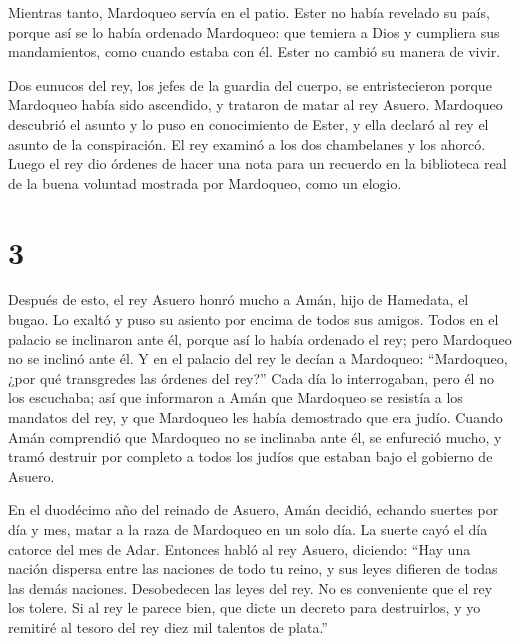  Mientras tanto, Mardoqueo servía en el patio.
 Ester no había revelado su país, porque así se lo había
ordenado Mardoqueo: que temiera a Dios y cumpliera sus mandamientos,
como cuando estaba con él. Ester no cambió su manera de vivir.

 Dos eunucos del rey, los jefes de la guardia del cuerpo,
se entristecieron porque Mardoqueo había sido ascendido, y trataron de
matar al rey Asuero.  Mardoqueo descubrió el asunto y lo
puso en conocimiento de Ester, y ella declaró al rey el asunto de la
conspiración.  El rey examinó a los dos chambelanes y los
ahorcó. Luego el rey dio órdenes de hacer una nota para un recuerdo en
la biblioteca real de la buena voluntad mostrada por Mardoqueo, como un
elogio.

\hypertarget{section-2}{%
\section{3}\label{section-2}}

 Después de esto, el rey Asuero honró mucho a Amán, hijo
de Hamedata, el bugao. Lo exaltó y puso su asiento por encima de todos
sus amigos.  Todos en el palacio se inclinaron ante él,
porque así lo había ordenado el rey; pero Mardoqueo no se inclinó ante
él.  Y en el palacio del rey le decían a Mardoqueo:
``Mardoqueo, ¿por qué transgredes las órdenes del rey?'' 
Cada día lo interrogaban, pero él no los escuchaba; así que informaron a
Amán que Mardoqueo se resistía a los mandatos del rey, y que Mardoqueo
les había demostrado que era judío.  Cuando Amán
comprendió que Mardoqueo no se inclinaba ante él, se enfureció mucho,
 y tramó destruir por completo a todos los judíos que
estaban bajo el gobierno de Asuero.

 En el duodécimo año del reinado de Asuero, Amán decidió,
echando suertes por día y mes, matar a la raza de Mardoqueo en un solo
día. La suerte cayó el día catorce del mes de Adar. 
Entonces habló al rey Asuero, diciendo: ``Hay una nación dispersa entre
las naciones de todo tu reino, y sus leyes difieren de todas las demás
naciones. Desobedecen las leyes del rey. No es conveniente que el rey
los tolere.  Si al rey le parece bien, que dicte un
decreto para destruirlos, y yo remitiré al tesoro del rey diez mil
talentos de plata.''

